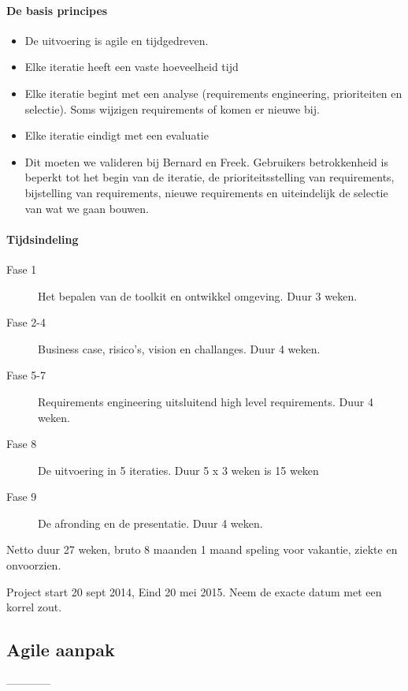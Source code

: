 \documentclass[a4paper,11pt,twoside,draft]{article}
\begin{document}
\paragraph{De basis principes}
\begin{itemize}
 \item De uitvoering is agile en tijdgedreven.
 \item Elke iteratie heeft een vaste hoeveelheid tijd
 \item Elke iteratie begint met een analyse (requirements engineering, prioriteiten en selectie). Soms wijzigen requirements of komen er nieuwe bij.
 \item Elke iteratie eindigt met een evaluatie
 \item Dit moeten we valideren bij Bernard en Freek. Gebruikers betrokkenheid is
 beperkt tot het begin van de iteratie, de prioriteitsstelling van requirements, bijstelling van
 requirements, nieuwe requirements en uiteindelijk de selectie van wat we gaan bouwen.
\end{itemize}

\paragraph{Tijdsindeling}

\begin{description}
 \item[Fase 1] Het bepalen van de toolkit en ontwikkel omgeving. Duur 3 weken.
 \item[Fase 2-4] Business case, risico's, vision en challanges. Duur 4 weken.
 \item[Fase 5-7] Requirements engineering uitsluitend high level requirements. Duur 4 weken.
 \item[Fase 8] De uitvoering in 5 iteraties. Duur 5 x 3 weken is 15 weken
 \item[Fase 9] De afronding en de presentatie. Duur 4 weken.
\end{description}

Netto duur 27 weken, bruto 8 maanden 1 maand speling voor vakantie, ziekte en onvoorzien.

Project start 20 sept 2014, Eind 20 mei 2015. Neem de exacte datum met een korrel zout.


\subsection{Agile aanpak}
------------
\end{document}
